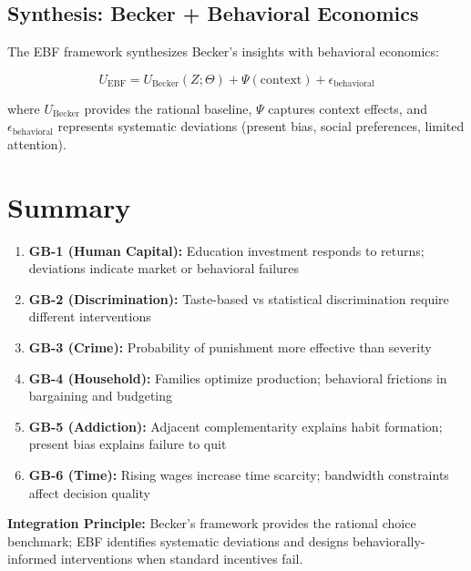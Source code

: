 \subsection{Synthesis: Becker + Behavioral Economics}

The EBF framework synthesizes Becker's insights with behavioral economics:

\begin{equation}
U_{\text{EBF}} = U_{\text{Becker}}(Z; \Theta) + \Psi(\text{context}) + \epsilon_{\text{behavioral}}
\label{eq:gb-synthesis}
\end{equation}

where $U_{\text{Becker}}$ provides the rational baseline, $\Psi$ captures context effects, and $\epsilon_{\text{behavioral}}$ represents systematic deviations (present bias, social preferences, limited attention).

\section{Summary}
\label{sec:gb-summary}

\begin{tcolorbox}[colback=blue!5!white,colframe=blue!75!black,title=Key Takeaways]
\begin{enumerate}
    \item \textbf{GB-1 (Human Capital):} Education investment responds to returns; deviations indicate market or behavioral failures
    \item \textbf{GB-2 (Discrimination):} Taste-based vs statistical discrimination require different interventions
    \item \textbf{GB-3 (Crime):} Probability of punishment more effective than severity
    \item \textbf{GB-4 (Household):} Families optimize production; behavioral frictions in bargaining and budgeting
    \item \textbf{GB-5 (Addiction):} Adjacent complementarity explains habit formation; present bias explains failure to quit
    \item \textbf{GB-6 (Time):} Rising wages increase time scarcity; bandwidth constraints affect decision quality
\end{enumerate}

\textbf{Integration Principle:} Becker's framework provides the rational choice benchmark; EBF identifies systematic deviations and designs behaviorally-informed interventions when standard incentives fail.
\end{tcolorbox}

